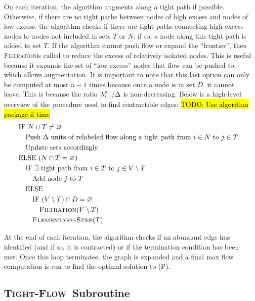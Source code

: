 \documentclass[11pt]{article}
\theoremstyle{definition}
\theoremstyle{definition}
\newcommand{\tf}{\textsc{Tight-Flow}}
\newcommand{\filtration}{\textsc{Filtration}}
\newcommand{\es}{\textsc{Elementary-Step}}
\newcommand{\todo}[1]{\hl{TODO: #1}}
\begin{document}
	On each iteration, the algorithm augments along a tight path if possible. Otherwise, if there
    are no tight paths between nodes of high excess and nodes of low excess, the algorithm checks
    if there are tight paths connecting high excess nodes to nodes not included in sets $T$ or $N$;
    if so, a node along this tight path is added to set $T$. If the algorithm cannot push flow
    or expand the ``frontier'', then \filtration is called to reduce the excess of relatively
    isolated nodes. This is useful because it expands the set of ``low excess'' nodes that flow
    can be pushed to, which allows augmentation. It is important to note that this last option
    can only be computed at most $n - 1$ times because once a node is in set $D$, it cannot leave.
    This is because the ratio $\abs{b_i^\mu} / \Delta$ is non-decreasing. Below is a high-level
    overview of the procedure used to find contractible edges:
    \todo{Use algorithm package if time}
	\begin{align*}
	&\text{IF $N \cap T \neq \varnothing$} \\
	&\quad \text{Push $\Delta$ units of relabeled flow along a tight path from $i \in N$ to $j \in T$} \\ 
	&\quad \text{Update sets accordingly} \\
	&\text{ELSE ($N \cap T = \varnothing$)} \\
	&\quad \text{IF $\exists$ tight path from $i \in T$ to $j \in V \setminus T$} \\
	&\quad \quad \text{Add node $j$ to $T$} \\
	&\quad \text{ELSE} \\
	&\quad \quad \text{IF $(V \setminus T) \cap D = \varnothing$} \\
	&\quad \quad \quad \text{\filtration($V \setminus T$)} \\
	&\quad \quad \text{\es($T$)} 
	\end{align*}
	
	At the end of each iteration, the algorithm checks if an abundant edge has
    identified (and if so, it is contracted) or if the termination condition has been met.
    Once this loop terminates, the graph is expanded and a final max flow computation
    is run to find the optimal solution to (P).
	\subsection{\tf\ Subroutine}\label{sec:tf}
    
\end{document}
